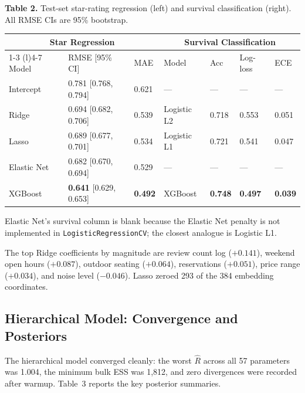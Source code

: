 \documentclass[10pt, letterpaper]{article}
\begin{document}
\begin{center}\small
\textbf{Table 2.} Test-set star-rating regression (left) and survival classification (right). All RMSE CIs are 95\% bootstrap.\\[4pt]
\renewcommand{\arraystretch}{1.2}
\begin{tabular}{@{}lll@{\hspace{1.5em}}llll@{}}
\toprule
\multicolumn{3}{c}{\textbf{Star Regression}} & \multicolumn{4}{c}{\textbf{Survival Classification}} \\
\cmidrule(r){1-3} \cmidrule(l){4-7}
Model & RMSE [95\% CI] & MAE & Model & Acc & Log-loss & ECE \\
\midrule
Intercept  & 0.781 [0.768, 0.794] & 0.621 & --- & --- & --- & --- \\
Ridge      & 0.694 [0.682, 0.706] & 0.539 & Logistic L2 & 0.718 & 0.553 & 0.051 \\
Lasso      & 0.689 [0.677, 0.701] & 0.534 & Logistic L1 & 0.721 & 0.541 & 0.047 \\
Elastic Net & 0.682 [0.670, 0.694] & 0.529 & --- & --- & --- & --- \\
XGBoost    & \textbf{0.641} [0.629, 0.653] & \textbf{0.492} & XGBoost & \textbf{0.748} & \textbf{0.497} & \textbf{0.039} \\
\bottomrule
\end{tabular}
\end{center}
{\footnotesize Elastic Net's survival column is blank because the Elastic Net penalty is not implemented in \texttt{LogisticRegressionCV}; the closest analogue is Logistic L1.\par}

The top Ridge coefficients by magnitude are review count log ($+0.141$), weekend open hours ($+0.087$), outdoor seating ($+0.064$), reservations ($+0.051$), price range ($+0.034$), and noise level ($-0.046$). Lasso zeroed 293 of the 384 embedding coordinates.

\subsection{Hierarchical Model: Convergence and Posteriors}

The hierarchical model converged cleanly: the worst $\hat{R}$ across all 57 parameters was 1.004, the minimum bulk ESS was 1,812, and zero divergences were recorded after warmup. Table~3 reports the key posterior summaries.
\end{document}
